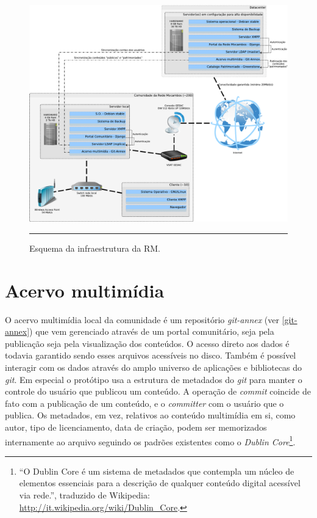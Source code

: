 \begin{figure}[htbp]
  \centering
  \includegraphics[width=\textwidth]{./Figure/SchemaServer_ReteMocambos-crop.pdf}
  \rule{35em}{0.5pt}
  \caption[Esquema da infraestrutura da RM]{Esquema da infraestrutura da RM.}
  \label{fig:SchemaServer_ReteMocambos}
\end{figure}

\section{Acervo multimídia}
O acervo multimídia local da comunidade é um repositório
\emph{git-annex} (ver \ref{git-annex}) que vem gerenciado através de
um portal comunitário, seja pela publicação seja pela visualização dos
conteúdos. O acesso direto aos dados é todavia garantido sendo esses
arquivos acessíveis no disco. Também é possível interagir com os dados
através do amplo universo de aplicações e bibliotecas do
\emph{git}. Em especial o protótipo usa a estrutura de metadados do
\emph{git} para manter o controle do usuário que publicou um
conteúdo. A operação de \emph{commit} coincide de fato com a
publicação de um conteúdo, e o \emph{committer} com o usuário que o
publica. Os metadados, em vez, relativos ao conteúdo multimídia em si,
como autor, tipo de licenciamento, data de criação, podem ser
memorizados internamente ao arquivo seguindo os padrões existentes
como o \emph{Dublin Core}\footnote{``O Dublin Core é um sistema de
  metadados que contempla um núcleo de elementos essenciais para a
  descrição de qualquer conteúdo digital acessível via rede.'',
  traduzido de Wikipedia:
  \url{http://it.wikipedia.org/wiki/Dublin_Core}.}.

